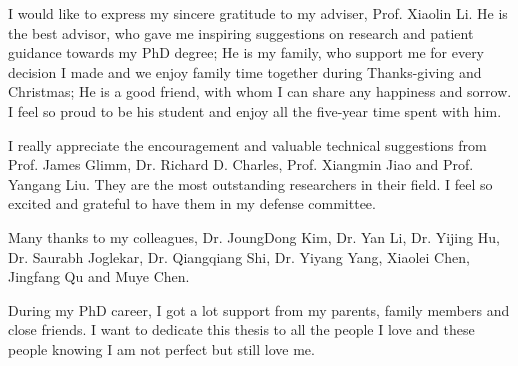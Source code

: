 I would like to express my sincere gratitude to my adviser, Prof. 
Xiaolin Li. He is the best advisor, who gave me inspiring suggestions
on research and patient guidance towards my PhD degree; He is my family, who 
support me for every decision I made and we enjoy family time together 
during Thanks-giving and Christmas; He is a good friend, with whom I can share
any happiness and sorrow. I feel so proud to be his student and enjoy all the
five-year time spent with him.

I really appreciate the encouragement and valuable technical suggestions from
Prof. James Glimm, Dr. Richard D. Charles, Prof. Xiangmin Jiao and Prof. Yangang Liu. 
They are the most outstanding researchers in their field. I feel so
excited and grateful to have them in my defense committee.  

Many thanks to my colleagues, Dr. JoungDong Kim, Dr. Yan Li, 
Dr. Yijing Hu, Dr.  Saurabh Joglekar, Dr. Qiangqiang Shi, 
Dr. Yiyang Yang, Xiaolei Chen, Jingfang Qu and Muye Chen.

During my PhD career, I got a lot support from my parents, family 
members and close friends. I want to dedicate this thesis to all the people
I love and these people knowing I am not perfect but still love me.